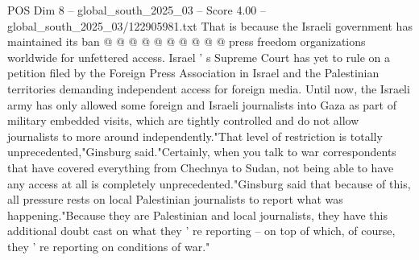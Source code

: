 \begin{textsample}{POS Dim 8 – global\_south\_2025\_03 – Score 4.00 – global\_south\_2025\_03/122905981.txt}
That is because the Israeli government has maintained its ban @ @ @ @ @ @ @ @ @ @ press freedom organizations worldwide for unfettered access.
Israel ' s Supreme Court has yet to rule on a petition filed by the Foreign Press Association in Israel and the Palestinian territories demanding independent access for foreign media.
Until now, the Israeli army has only allowed some foreign and Israeli journalists into Gaza as part of military embedded visits, which are tightly controlled and do not allow journalists to more around independently."That level of restriction is totally unprecedented,"Ginsburg said."Certainly, when you talk to war correspondents that have covered everything from Chechnya to Sudan, not being able to have any access at all is completely unprecedented."Ginsburg said that because of this, all pressure rests on local Palestinian journalists to report what was happening."Because they are Palestinian and local journalists, they have this additional doubt cast on what they ' re reporting -- on top of which, of course, they ' re reporting on conditions of war."

\end{textsample}
